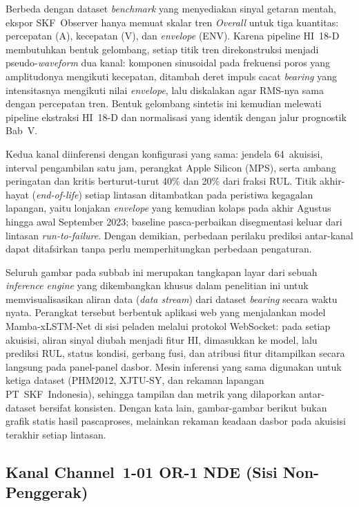 {\color{blue}Berbeda dengan dataset \emph{benchmark} yang menyediakan sinyal getaran mentah,
ekspor SKF~Observer hanya memuat skalar tren \emph{Overall} untuk tiga kuantitas:
percepatan (A), kecepatan (V), dan \emph{envelope} (ENV). Karena pipeline HI~18-D
membutuhkan bentuk gelombang, setiap titik tren direkonstruksi menjadi
pseudo-\emph{waveform} dua kanal: komponen sinusoidal pada frekuensi poros yang
amplitudonya mengikuti kecepatan, ditambah deret impuls cacat \emph{bearing} yang
intensitasnya mengikuti nilai \emph{envelope}, lalu diskalakan agar RMS-nya sama
dengan percepatan tren. Bentuk gelombang sintetis ini kemudian melewati pipeline
ekstraksi HI~18-D dan normalisasi yang identik dengan jalur prognostik Bab~V.}

{\color{blue}Kedua kanal diinferensi dengan konfigurasi yang sama: jendela 64~akuisisi,
interval pengambilan satu jam, perangkat Apple Silicon (MPS), serta ambang
peringatan dan kritis berturut-turut 40\% dan 20\% dari fraksi RUL. Titik
akhir-hayat (\emph{end-of-life}) setiap lintasan ditambatkan pada peristiwa
kegagalan lapangan, yaitu lonjakan \emph{envelope} yang kemudian kolaps pada
akhir Agustus hingga awal September 2023; baseline pasca-perbaikan disegmentasi
keluar dari lintasan \emph{run-to-failure}. Dengan demikian, perbedaan perilaku
prediksi antar-kanal dapat ditafsirkan tanpa perlu memperhitungkan perbedaan
pengaturan.}

{\color{blue}Seluruh gambar pada subbab ini merupakan tangkapan layar dari sebuah
\emph{inference engine} yang dikembangkan khusus dalam penelitian ini untuk
memvisualisasikan aliran data (\emph{data stream}) dari dataset \emph{bearing}
secara waktu nyata. Perangkat tersebut berbentuk aplikasi web yang menjalankan
model Mamba-xLSTM-Net di sisi peladen melalui protokol WebSocket: pada setiap
akuisisi, aliran sinyal diubah menjadi fitur HI, dimasukkan ke model, lalu
prediksi RUL, status kondisi, gerbang fusi, dan atribusi fitur ditampilkan
secara langsung pada panel-panel dasbor. Mesin inferensi yang sama digunakan
untuk ketiga dataset (PHM2012, XJTU-SY, dan rekaman lapangan PT~SKF~Indonesia),
sehingga tampilan dan metrik yang dilaporkan antar-dataset bersifat konsisten.
Dengan kata lain, gambar-gambar berikut bukan grafik statis hasil pascaproses,
melainkan rekaman keadaan dasbor pada akuisisi terakhir setiap lintasan.}

{\color{blue}\subsection{Kanal Channel~1-01 OR-1 NDE (Sisi Non-Penggerak)}}
\label{lamp:skf_prognostik_ch1}

